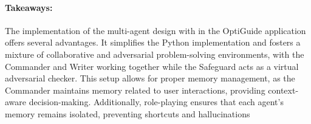 \paragraph{Takeaways:} 
The implementation of the multi-agent design with \libName{} in the OptiGuide application offers several advantages. It simplifies the Python implementation and fosters a mixture of collaborative and adversarial problem-solving environments, with the Commander and Writer working together while the Safeguard acts as a virtual adversarial checker. This setup allows for proper memory management, as the Commander maintains memory related to user interactions, providing context-aware decision-making. Additionally, role-playing ensures that each agent's memory remains isolated, preventing shortcuts and hallucinations


